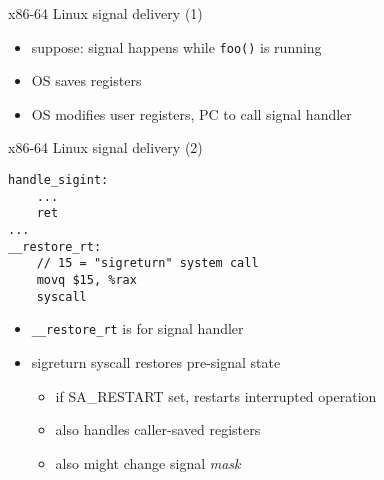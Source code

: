 \usetikzlibrary{arrows.meta,matrix}
\begin{frame}{x86-64 Linux signal delivery (1)}
\begin{itemize}
\item suppose: signal happens while {\tt foo()} is running
\item OS saves registers 
\item OS modifies user registers, PC to call signal handler
\end{itemize}
\end{frame}

\begin{frame}[fragile,label=sigReturn]{x86-64 Linux signal delivery (2)}
\begin{lstlisting}
handle_sigint:
    ...
    ret
...
__restore_rt:
    // 15 = "sigreturn" system call
    movq $15, %rax
    syscall
\end{lstlisting}
\begin{itemize}
\item {\tt \_\_restore\_rt} is  for signal handler
\item sigreturn syscall restores pre-signal state
\begin{itemize}
    \item if SA\_RESTART set, restarts interrupted operation
    \item also handles caller-saved registers
    \item also might change signal \textit{mask}
\end{itemize}
\end{itemize}
\end{frame}


